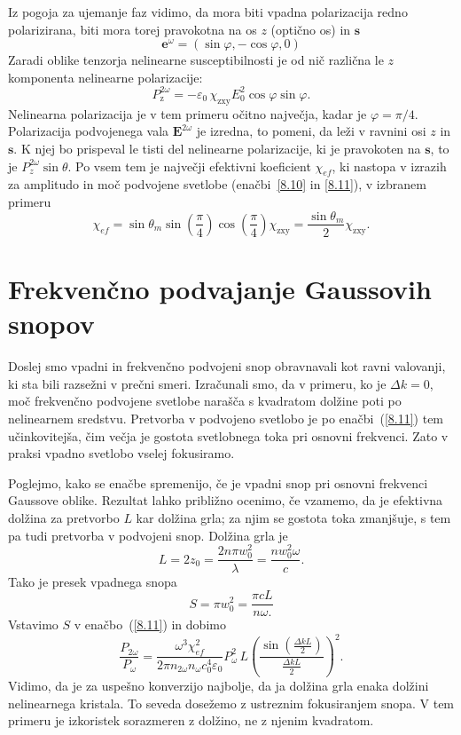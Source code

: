 \documentclass[11pt,fleqn]{book} %
\newcommand{\beq}{\begin{equation}}
\newcommand{\eeq}{\end{equation}}
\begin{document}
Iz pogoja za ujemanje faz vidimo, da mora biti vpadna polarizacija redno polarizirana, 
biti mora torej pravokotna na os $z$ (optično os) in $\mathbf{s}$
\begin{equation}
\mathbf{e}^{\omega}=(\sin\varphi,-\cos\varphi,0)
\label{8.15}
\end{equation}
Zaradi oblike tenzorja nelinearne susceptibilnosti je od nič različna
le $z$ komponenta nelinearne polarizacije: 
\begin{equation}
P_{\textrm{z}}^{2\omega}=- \varepsilon_0\, \chi_{\textrm{zxy}}E_{0}^2\cos\varphi\sin\varphi.
\label{8.151}
\end{equation}
Nelinearna polarizacija je v tem primeru očitno največja, kadar je $\varphi=\pi/4$.
Polarizacija podvojenega vala $\mathbf{E}^{2\omega}$ je izredna, to pomeni, da
leži v ravnini osi $z$ in $\mathbf{s}$. K njej bo prispeval le tisti
del nelinearne polarizacije, ki je pravokoten na $\mathbf{s}$, to je
$P_{z}^{2\omega}\sin\theta$. Po vsem tem je največji efektivni koeficient
$\chi_{ef}$, ki nastopa v izrazih za amplitudo in moč podvojene svetlobe
(enačbi~\ref{8.10} in \ref{8.11}), v izbranem primeru 
\begin{equation}
\chi_{ef}= \sin\theta_m \sin \left(\frac{\pi}{4}\right) \cos 
\left(\frac{\pi}{4}\right) \chi_{\textrm{zxy}} = \frac{\sin\theta_m}{2}\chi_{\textrm{zxy}}.
\label{8.16}
\end{equation}

\section{Frekvenčno podvajanje Gaussovih snopov}

Doslej smo vpadni in frekvenčno podvojeni snop obravnavali kot ravni valovanji,
ki sta bili razsežni v prečni smeri. Izračunali smo, da v primeru, ko je $\Delta k=0$,
moč frekvenčno podvojene svetlobe narašča s kvadratom dolžine poti po nelinearnem
sredstvu. Pretvorba v podvojeno svetlobo je po enačbi~(\ref{8.11}) tem
učinkovitejša, čim večja je gostota svetlobnega toka pri osnovni frekvenci.
Zato v praksi vpadno svetlobo vselej fokusiramo.  


Poglejmo, kako se enačbe spremenijo, če je vpadni snop pri osnovni 
frekvenci Gaussove oblike. Rezultat lahko približno ocenimo, če vzamemo, da je
efektivna dolžina za pretvorbo $L$ kar dolžina grla; za njim se
gostota toka zmanjšuje, s tem pa tudi pretvorba v podvojeni snop.
Dolžina grla je 
\beq
L=2z_{0}=\frac{2n \pi w_{0}^{2}}{\lambda} = \frac{n w_0^2 \omega}{c}.
\eeq
Tako je presek vpadnega snopa
\beq
S=\pi w_{0}^{2} = \frac{\pi c L}{n \omega.}
\eeq
Vstavimo $S$ v enačbo~(\ref{8.11}) in dobimo 
\begin{equation}
\frac{P_{2\omega}}{P_{\omega}}=
\frac{\omega^3 \chi_{ef}^2}{2 \pi n_{2\omega} n_\omega c_0^4\varepsilon_0} P_\omega^2\, L
\left(\frac{\sin\left(\frac{\Delta k L}{2}\right)}{\frac{\Delta kL}{2}}\right)^2.
\label{8.17}
\end{equation}
Vidimo, da je za uspešno konverzijo najbolje, da ja dolžina grla
enaka dolžini nelinearnega kristala. To seveda dosežemo z ustreznim
fokusiranjem snopa. V tem primeru je izkoristek sorazmeren z dolžino,
ne z njenim kvadratom.\\
\end{document}
